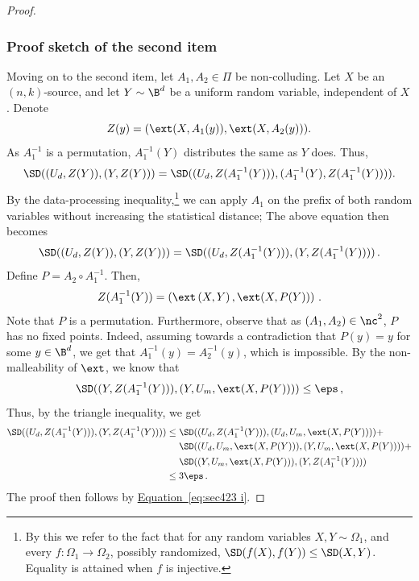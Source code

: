 \documentclass[11pt]{article}
\numberwithin{equation}{section}
\theoremstyle{definition}
\theoremstyle{plain}
\newcommand{\expeqref}[2]{\hyperref[#2]{#1~\eqref{#2}}}
\begin{document}
\begin{proof}
%
\subsubsection*{Proof sketch of the second item}
	
Moving on to the second item, let $A_1,A_2 \in \Pi$ be %
non-colluding.
Let $X$ be an $(n,k)$-source, and let $Y \sim \B^{d}$ be 
	a uniform random variable, independent of $X$. Denote	
	\[
	Z(y) = ( \ext(X,A_{1}(y)),\ext(X,A_{2}(y)) ).
	\]
	As $A_{1}^{-1}$ is a permutation, $A_1^{-1}(Y)$ distributes the same as $Y$ does. Thus,
	\[
	\SD((U_d,Z(Y)),(Y,Z(Y))) = 
	\SD((U_d,Z(A_{1}^{-1}(Y))),({A}_{1}^{-1}(Y),{Z}({A}_{1}^{-1}(Y)))).
	\]
	By the data-processing inequality,\footnote{By this we refer to the fact that for any random variables
	$X,Y \sim \Omega_1$, and every $f \colon \Omega_1 \rightarrow \Omega_2$, possibly randomized, $\SD(f(X),f(Y)) \le \SD(X,Y)$. Equality is attained when $f$ is injective.}
	we can apply ${A}_1$ on the prefix of both random variables without increasing
	the statistical distance; The above equation then becomes
	\begin{equation}\label{eq:sec423 i}
	\SD((U_d,{Z}(Y)),(Y,{Z}(Y))) = 
	\SD((U_d,{Z}({A}_{1}^{-1}(Y))),(Y,{Z}({A}_{1}^{-1}(Y))))\,.
	\end{equation}
	Define $P = {A}_{2} \circ {A}_{1}^{-1}$. Then,
	\begin{align*}
	{Z}({A}_{1}^{-1}(Y)) = 
	\left( \ext\left( X,Y \right),\ext( X,P(Y)) \right)\,.
	\end{align*}
	Note that $P$ is a permutation. Furthermore, observe that as $({A}_1,{A}_{2}) \in \nc^{2}$,  $P$ has no fixed points. Indeed, assuming
	towards a contradiction that $P(y)=y$ for some $y \in \B^{d}$, we get
	that ${A}_{1}^{-1}(y) = {A}^{-1}_{2}(y)$, which is impossible.
	By the non-malleability of $\ext$, we know that
	\[
	\SD((Y,{Z}({A}_1^{-1}(Y))),(Y,U_m,\ext(X,P(Y)))) \le \eps\,,
	\]
    Thus, by the triangle inequality, we get
	\begin{align}
	\SD((U_d,{Z}({A}_{1}^{-1}(Y))),(Y,{Z}({A}_{1}^{-1}(Y)))) &\le 
	\SD((U_d,{Z}({A}_{1}^{-1}(Y))),(U_d,U_m,\ext(X,P(Y)))) + \nonumber \\
	& ~~~~\SD((U_d,U_m,\ext(X,P(Y))),(Y,U_m,\ext(X,P(Y)))) + \nonumber \\
	& ~~~~\SD((Y,U_m,\ext(X,P(Y))),(Y,{Z}({A}_{1}^{-1}(Y)))) \nonumber \\
	&\le 3\eps\,.
	\end{align}
	The proof then follows by \expeqref{Equation}{eq:sec423 i}.
\end{proof}
\end{document}
